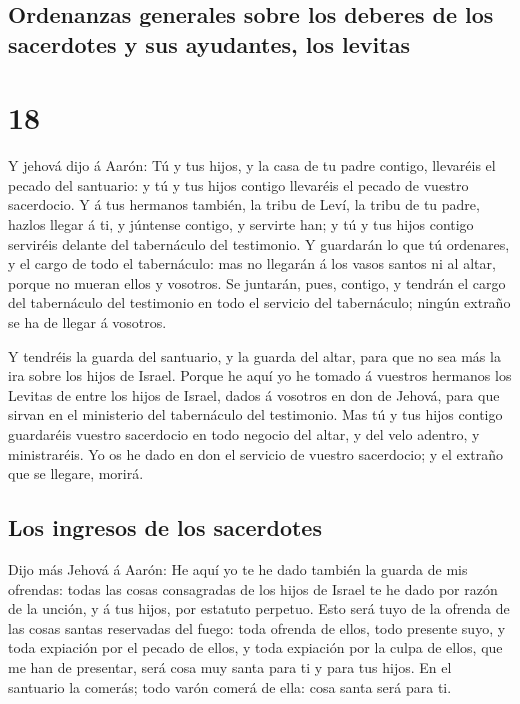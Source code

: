 \hypertarget{ordenanzas-generales-sobre-los-deberes-de-los-sacerdotes-y-sus-ayudantes-los-levitas}{%
\subsection{Ordenanzas generales sobre los deberes de los sacerdotes y
sus ayudantes, los
levitas}\label{ordenanzas-generales-sobre-los-deberes-de-los-sacerdotes-y-sus-ayudantes-los-levitas}}

\hypertarget{section-17}{%
\section{18}\label{section-17}}

 Y jehová dijo á Aarón: Tú y tus hijos, y la casa de tu
padre contigo, llevaréis el pecado del santuario: y tú y tus hijos
contigo llevaréis el pecado de vuestro sacerdocio.  Y á tus
hermanos también, la tribu de Leví, la tribu de tu padre, hazlos llegar
á ti, y júntense contigo, y servirte han; y tú y tus hijos contigo
serviréis delante del tabernáculo del testimonio.  Y
guardarán lo que tú ordenares, y el cargo de todo el tabernáculo: mas no
llegarán á los vasos santos ni al altar, porque no mueran ellos y
vosotros.  Se juntarán, pues, contigo, y tendrán el cargo
del tabernáculo del testimonio en todo el servicio del tabernáculo;
ningún extraño se ha de llegar á vosotros.

 Y tendréis la guarda del santuario, y la guarda del altar,
para que no sea más la ira sobre los hijos de Israel. 
Porque he aquí yo he tomado á vuestros hermanos los Levitas de entre los
hijos de Israel, dados á vosotros en don de Jehová, para que sirvan en
el ministerio del tabernáculo del testimonio.  Mas tú y tus
hijos contigo guardaréis vuestro sacerdocio en todo negocio del altar, y
del velo adentro, y ministraréis. Yo os he dado en don el servicio de
vuestro sacerdocio; y el extraño que se llegare, morirá.

\hypertarget{los-ingresos-de-los-sacerdotes}{%
\subsection{Los ingresos de los
sacerdotes}\label{los-ingresos-de-los-sacerdotes}}

 Dijo más Jehová á Aarón: He aquí yo te he dado también la
guarda de mis ofrendas: todas las cosas consagradas de los hijos de
Israel te he dado por razón de la unción, y á tus hijos, por estatuto
perpetuo.  Esto será tuyo de la ofrenda de las cosas santas
reservadas del fuego: toda ofrenda de ellos, todo presente suyo, y toda
expiación por el pecado de ellos, y toda expiación por la culpa de
ellos, que me han de presentar, será cosa muy santa para ti y para tus
hijos.  En el santuario la comerás; todo varón comerá de
ella: cosa santa será para ti.


